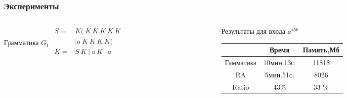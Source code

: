 \documentclass{beamer}
\begin{document}
	\begin{frame} 
		\frametitle{Эксперименты}
		\begin{center}
            \begin{columns}
        	    \begin{column}{4.1cm}
          	     Грамматика $G_1$
                   \vspace{2pt}
                $
                \begin{array}{rl}
                S =& K(\ K\ K\ K\ K\ K \ \\
                &| a\ K\ K\ K\ K) \\
                K =& S\ K\ |\ a\ K\ |\ a \\
                \end{array}
                $
       			\end{column}
       			\begin{column}{6cm}
            				Результаты для входа $a^{450}$
                \\
                \vspace{2pt}
                \begin{tabular}{ | c | c | c | }
                    \hline
                    & Время &   Память,Мб\\ \hline
                    Гамматика& 10мин.13с.  &  11818 \\ \hline 
                    RA       & 5мин.51с.  & 8026  \\ \hline \hline
                    Ratio   &  43$\%$       &  33 $\%$ \\ \hline
                \end{tabular}
            			\end{column}
	    \end{columns}
    \begin{tikzpicture}[scale=.7]

\end{tikzpicture}
\end{center}
\end{frame}
\end{document}
